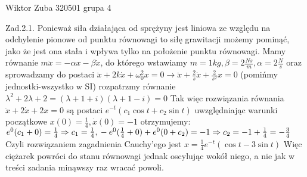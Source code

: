 \documentclass{article}
\begin{document}
Wiktor Zuba 320501 grupa 4
\newline

Zad.2.1.
\newline
\newline
Ponieważ siła działająca od sprężyny jest liniowa ze względu na odchylenie pionowe od punktu równowagi to siłę grawitacji możemy pominąć,
jako że jest ona stała i wpływa tylko na położenie punktu równowagi.\newline
Mamy równanie $m\ddot{x}=-\alpha x-\beta\dot{x}$, do którego wstawiamy $m=1kg,\beta=2\frac{Ns}{m},\alpha=2\frac{N}{s}$
oraz sprowadzamy do postaci $\ddot{x}+2k\dot{x}+\omega_0^2x=0\rightarrow\ddot{x}+\frac{2}{s}\dot{x}+\frac{2}{s^2}x=0$ (pomińmy jednostki-wszystko w SI)\newline
rozpatrzmy równanie $\lambda^2+2\lambda+2=(\lambda+1+i)(\lambda+1-i)=0$\newline
Tak więc rozwiązania równania $\ddot{x}+2\dot{x}+2x=0$ są postaci $e^{-t}(c_1\cos{t}+c_2\sin{t})$\newline
uwzględniając warunki początkowe $x(0)=\frac{1}{4}, \dot{x}(0)=-1$ otrzymujemy:
$
e^{0}(c_1+0)=\frac{1}{4}\Rightarrow c_1=\frac{1}{4},\newline-e^0(\frac{1}{4}+0)+e^{0}(0+c_2)=-1\Rightarrow c_2=-1+\frac{1}{4}=-\frac{3}{4}\newline
$
Czyli rozwiązaniem zagadnienia Cauchy'ego jest $x=\frac{1}{4}e^{-t}(\cos{t}-3\sin{t})$\newline
Więc ciężarek powróci do stanu równowagi jednak oscylując wokół niego, a nie jak w treści zadania minąwszy raz wracać powoli. 
\newline
\newline
\end{document}
